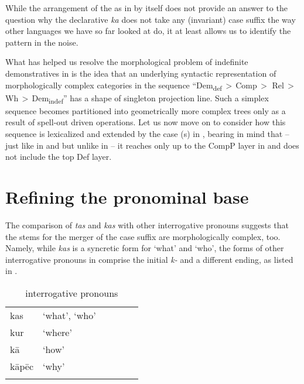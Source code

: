     
While the arrangement of the  as in  by itself does not provide an answer to the question why the  declarative  \textit{ka} does not take any (invariant) case suffix the way other languages we have so far looked at do, it at least allows us to identify the pattern in the noise.
\par
What has helped us resolve the morphological  problem of indefinite demonstratives in  is the idea that an underlying syntactic representation of morphologically complex categories in the sequence ``Dem\textsubscript{def}\,$>$\,Comp\,$>$ Rel\,$>$\,Wh\,$>$\,Dem\textsubscript{indef}'' has a shape of singleton projection line.  
Such a simplex sequence becomes partitioned into geometrically more complex trees only as a result of spell-out driven operations.
Let us now move on to consider how this sequence is lexicalized and extended by the case (s) in , bearing in mind that -- just like in  and  but unlike in  -- it reaches only up to the CompP layer in  and does not include the top Def layer.

\section{Refining the pronominal base}

The comparison of \textit{tas} and \textit{kas} with other interrogative pronouns suggests that the stems for the merger of the case suffix are morphologically complex, too. Namely, while \textit{kas} is a syncretic form for `what' and `who', the forms of other interrogative pronouns in  comprise the initial \textit{k-} and a different ending, as listed in . 

\begin{table}
\caption{ interrogative pronouns}
\label{Lat:wh-pronouns}
\begin{tabular}[t]{ l l l l l l }
\lsptoprule	
kas & `what', `who'\\
kur & `where'\\
k\={a} & `how'\\
k\={a}p\={e}c & `why'\\
\lspbottomrule
\end{tabular}
\end{table}

